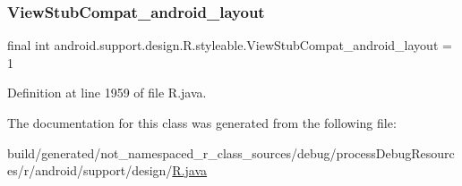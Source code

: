 \subsubsection{\texorpdfstring{ViewStubCompat\_android\_layout}{ViewStubCompat\_android\_layout}}
{\footnotesize\ttfamily final int android.\+support.\+design.\+R.\+styleable.\+View\+Stub\+Compat\+\_\+android\+\_\+layout = 1\hspace{0.3cm}{\ttfamily [static]}}



Definition at line 1959 of file R.\+java.



The documentation for this class was generated from the following file\+:\begin{DoxyCompactItemize}
\item 
build/generated/not\+\_\+namespaced\+\_\+r\+\_\+class\+\_\+sources/debug/process\+Debug\+Resources/r/android/support/design/\mbox{\hyperlink{android_2support_2design_2_r_8java}{R.\+java}}\end{DoxyCompactItemize}
